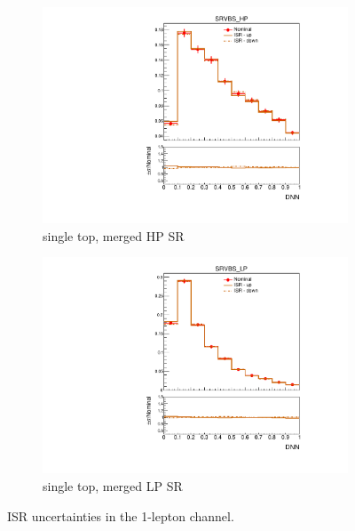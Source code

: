 \begin{figure}[htp]
\begin{subfigure}[b]{0.3\textwidth}
        \includegraphics[width=\textwidth]{figures/1lep/PDFUnc/ISR/stop_0ptag1pfat0pjet_0ptv_SRVBS_HP_DNN_SysTheoryISR_stop__1up_Norm.pdf}
        \caption{single top, merged HP SR}
    \end{subfigure}
    \begin{subfigure}[b]{0.3\textwidth}
        \includegraphics[width=\textwidth]{figures/1lep/PDFUnc/ISR/stop_0ptag1pfat0pjet_0ptv_SRVBS_LP_DNN_SysTheoryISR_stop__1up_Norm.pdf}
        \caption{single top, merged LP SR}
    \end{subfigure}
    \caption{ISR uncertainties in the 1-lepton channel.}
    \label{fig:isrUnc1Lep}
\end{figure}

